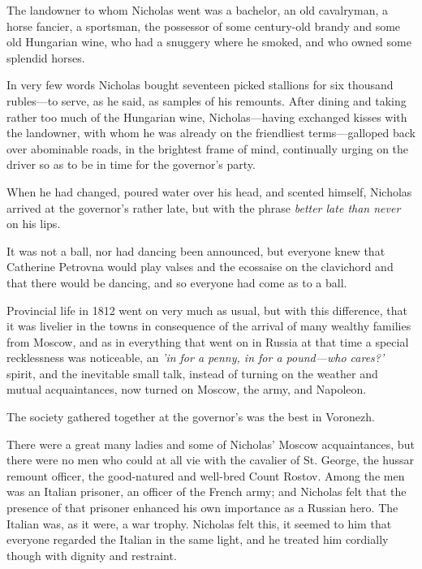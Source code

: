 The landowner to whom Nicholas went was a bachelor, an old
cavalryman, a horse fancier, a sportsman, the possessor of some
century-old brandy and some old Hungarian wine, who had a
snuggery where he smoked, and who owned some splendid horses.

In very few words Nicholas bought seventeen picked stallions for
six thousand rubles---to serve, as he said, as samples of his
remounts. After dining and taking rather too much of the
Hungarian wine, Nicholas---having exchanged kisses with the
landowner, with whom he was already on the friendliest
terms---galloped back over abominable roads, in the brightest
frame of mind, continually urging on the driver so as to be in
time for the governor's party.

When he had changed, poured water over his head, and scented
himself, Nicholas arrived at the governor's rather late, but with
the phrase \emph{better late than never} on his lips.

It was not a ball, nor had dancing been announced, but everyone
knew that Catherine Petrovna would play valses and the ecossaise
on the clavichord and that there would be dancing, and so
everyone had come as to a ball.

Provincial life in 1812 went on very much as usual, but with this
difference, that it was livelier in the towns in consequence of
the arrival of many wealthy families from Moscow, and as in
everything that went on in Russia at that time a special
recklessness was noticeable, an \emph{'in for a penny, in for a
pound---who cares?'} spirit, and the inevitable small talk,
instead of turning on the weather and mutual acquaintances, now
turned on Moscow, the army, and Napoleon.

The society gathered together at the governor's was the best in
Voronezh.

There were a great many ladies and some of Nicholas' Moscow
acquaintances, but there were no men who could at all vie with
the cavalier of St. George, the hussar remount officer, the
good-natured and well-bred Count Rostov. Among the men was an
Italian prisoner, an officer of the French army; and Nicholas
felt that the presence of that prisoner enhanced his own
importance as a Russian hero. The Italian was, as it were, a war
trophy. Nicholas felt this, it seemed to him that everyone
regarded the Italian in the same light, and he treated him
cordially though with dignity and restraint.


